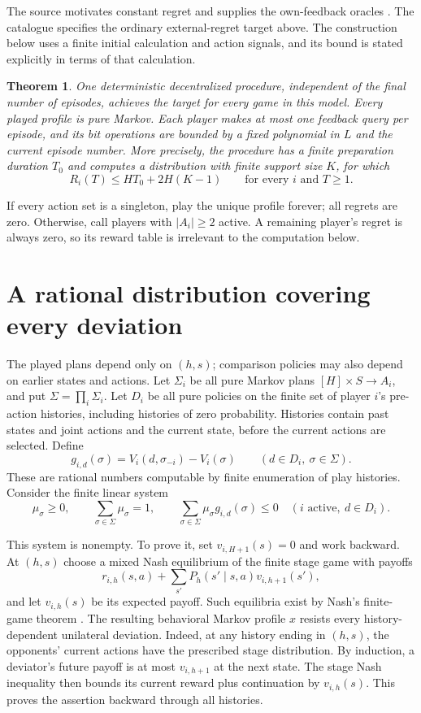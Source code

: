 \documentclass[11pt]{article}
\newtheorem{theorem}{Theorem}
\begin{document}
The source motivates constant regret and supplies the own-feedback
oracles \cite[\S\S2.3--2.5 and 5]{yb}. The catalogue specifies the
ordinary external-regret target above. The
construction below uses a finite initial calculation and action signals,
and its bound is stated explicitly in terms of that calculation.

\begin{theorem}\label{main}
One deterministic decentralized procedure, independent of the final
number of episodes, achieves the target for every game in this model.
Every played profile is pure Markov. Each player makes at most one
feedback query per episode, and its bit operations are bounded by a
fixed polynomial in $L$ and the current episode number.
More precisely, the procedure has a finite preparation duration $T_0$
and computes a distribution with finite support size $K$, for which
\[
                  R_i(T)\leq H T_0+2H(K-1)
                  \qquad\text{for every }i\text{ and }T\geq1.
\]
\end{theorem}

If every action set is a singleton, play the unique profile forever;
all regrets are zero. Otherwise, call players with $|A_i|\geq2$ active.
A remaining player's regret is always zero, so its reward table is
irrelevant to the computation below.

\section{A rational distribution covering every deviation}
The played plans depend only on $(h,s)$; comparison policies may also
depend on earlier states and actions.
Let $\Sigma_i$ be all pure Markov plans $[H]\times S\to A_i$, and put
$\Sigma=\prod_i\Sigma_i$. Let $D_i$ be all pure policies on the finite
set of player $i$'s pre-action histories, including histories of zero
probability. Histories contain past states and joint actions and the
current state, before the current actions are selected. Define
\[
 g_{i,d}(\sigma)=V_i(d,\sigma_{-i})-V_i(\sigma)
 \qquad(d\in D_i,\ \sigma\in\Sigma).
\]
These are rational numbers computable by finite enumeration of play
histories. Consider the finite linear system
\begin{equation}\label{lp}
 \mu_\sigma\geq0,\qquad \sum_{\sigma\in\Sigma}\mu_\sigma=1,
 \qquad \sum_{\sigma\in\Sigma}\mu_\sigma g_{i,d}(\sigma)\leq0
 \quad(i\text{ active},\ d\in D_i).
\end{equation}

This system is nonempty. To prove it, set $v_{i,H+1}(s)=0$ and work
backward. At $(h,s)$ choose a mixed Nash equilibrium of the finite
stage game with payoffs
\[
 r_{i,h}(s,a)+\sum_{s'}P_h(s'\mid s,a)v_{i,h+1}(s'),
\]
and let $v_{i,h}(s)$ be its expected payoff. Such equilibria exist by
Nash's finite-game theorem \cite{nash}. The resulting behavioral Markov
profile $x$ resists every history-dependent unilateral deviation.
Indeed, at any history ending in $(h,s)$, the opponents' current actions
have the prescribed stage distribution. By induction, a deviator's
future payoff is at most $v_{i,h+1}$ at the next state. The stage Nash
inequality then bounds its current reward plus continuation by
$v_{i,h}(s)$. This proves the assertion backward through all histories.
\end{document}
